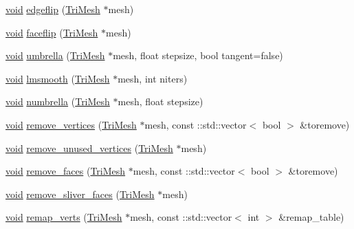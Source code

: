\begin{DoxyCompactItemize}
\item 
\hyperlink{namespacetrimesh_a784ddfd979e1c579bda795a8edfc3f43}{void} \hyperlink{namespacetrimesh_a53d8b8510a41991617d9cccc707460ea}{edgeflip} (\hyperlink{classtrimesh_1_1TriMesh}{Tri\+Mesh} $\ast$mesh)
\item 
\hyperlink{namespacetrimesh_a784ddfd979e1c579bda795a8edfc3f43}{void} \hyperlink{namespacetrimesh_af304d7d230cbf6775650f317ce2c85d3}{faceflip} (\hyperlink{classtrimesh_1_1TriMesh}{Tri\+Mesh} $\ast$mesh)
\item 
\hyperlink{namespacetrimesh_a784ddfd979e1c579bda795a8edfc3f43}{void} \hyperlink{namespacetrimesh_a5650b822926d11c64efb1aff2eff8b8a}{umbrella} (\hyperlink{classtrimesh_1_1TriMesh}{Tri\+Mesh} $\ast$mesh, float stepsize, bool tangent=false)
\item 
\hyperlink{namespacetrimesh_a784ddfd979e1c579bda795a8edfc3f43}{void} \hyperlink{namespacetrimesh_a21626ba22ad674850099acc05042f970}{lmsmooth} (\hyperlink{classtrimesh_1_1TriMesh}{Tri\+Mesh} $\ast$mesh, int niters)
\item 
\hyperlink{namespacetrimesh_a784ddfd979e1c579bda795a8edfc3f43}{void} \hyperlink{namespacetrimesh_ae182a141ba9c94adca9f6d6f733ae4d1}{numbrella} (\hyperlink{classtrimesh_1_1TriMesh}{Tri\+Mesh} $\ast$mesh, float stepsize)
\item 
\hyperlink{namespacetrimesh_a784ddfd979e1c579bda795a8edfc3f43}{void} \hyperlink{namespacetrimesh_a0fcaeb83417f32b5128881cb1076e7de}{remove\+\_\+vertices} (\hyperlink{classtrimesh_1_1TriMesh}{Tri\+Mesh} $\ast$mesh, const \+::std\+::vector$<$ bool $>$ \&toremove)
\item 
\hyperlink{namespacetrimesh_a784ddfd979e1c579bda795a8edfc3f43}{void} \hyperlink{namespacetrimesh_a0930a3eeaa4d0e80fbccb6b1baf71525}{remove\+\_\+unused\+\_\+vertices} (\hyperlink{classtrimesh_1_1TriMesh}{Tri\+Mesh} $\ast$mesh)
\item 
\hyperlink{namespacetrimesh_a784ddfd979e1c579bda795a8edfc3f43}{void} \hyperlink{namespacetrimesh_a8aa31b33984576eec08cbddfd59456f4}{remove\+\_\+faces} (\hyperlink{classtrimesh_1_1TriMesh}{Tri\+Mesh} $\ast$mesh, const \+::std\+::vector$<$ bool $>$ \&toremove)
\item 
\hyperlink{namespacetrimesh_a784ddfd979e1c579bda795a8edfc3f43}{void} \hyperlink{namespacetrimesh_afe82003e1666436750d8920cc5f8aa1c}{remove\+\_\+sliver\+\_\+faces} (\hyperlink{classtrimesh_1_1TriMesh}{Tri\+Mesh} $\ast$mesh)
\item 
\hyperlink{namespacetrimesh_a784ddfd979e1c579bda795a8edfc3f43}{void} \hyperlink{namespacetrimesh_a21a4ec76f2dfeff182e6170eab0ce31b}{remap\+\_\+verts} (\hyperlink{classtrimesh_1_1TriMesh}{Tri\+Mesh} $\ast$mesh, const \+::std\+::vector$<$ int $>$ \&remap\+\_\+table)

\end{DoxyCompactItemize}
